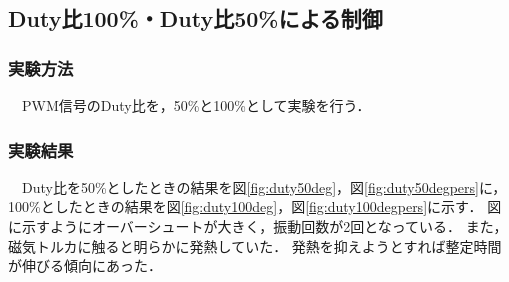 \subsection{Duty比100\%・Duty比50\%による制御}
\subsubsection{実験方法}
　PWM信号のDuty比を，50\%と100\%として実験を行う．


\subsubsection{実験結果}
　Duty比を50\%としたときの結果を図\ref{fig:duty50deg}，図\ref{fig:duty50degpers}に，100\%としたときの結果を図\ref{fig:duty100deg}，図\ref{fig:duty100degpers}に示す．
図に示すようにオーバーシュートが大きく，振動回数が2回となっている．
また，磁気トルカに触ると明らかに発熱していた．
発熱を抑えようとすれば整定時間が伸びる傾向にあった．

